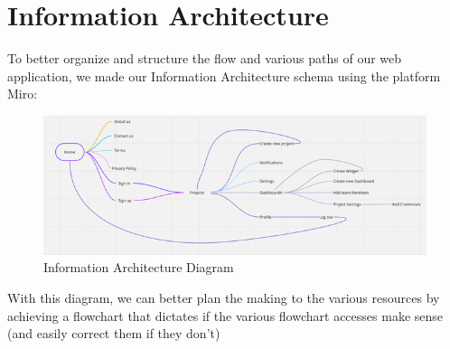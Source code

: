 \documentclass[a4paper,twoside,10pt]{report}
\begin{document}
\section{Information Architecture}
To better organize and structure the flow and various paths of our web application, we made our Information Architecture schema using the platform Miro:
\\ \newline
\begin{figure}[h!]
\center
    \includegraphics[width=\textwidth]{information-architecture.png}
\caption{Information Architecture Diagram}
\end{figure}

With this diagram, we can better plan the making to the various resources by achieving a flowchart that dictates if the various flowchart accesses make sense (and easily correct them if they don't)
\end{document}
